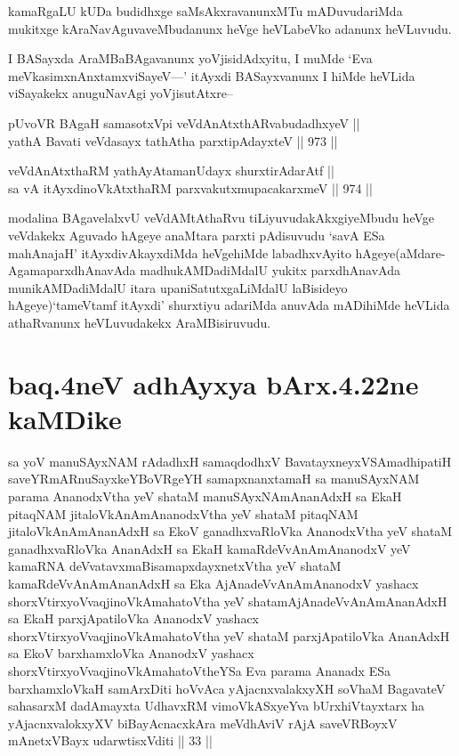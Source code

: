 \begin{artha}
kamaRgaLU kUDa budidhxge saMsAkxravanunxMTu mADuvudariMda mukitxge kAraNavAguvaveMbudanunx heVge heVLabeVko adanunx heVLuvudu.
\end{artha}

\begin{artha}
I BASayxda AraMBaBAgavanunx yoVjisidAdxyitu, I muMde `Eva meVkasimxnAnxtamxviSayeV---' itAyxdi BASayxvanunx I hiMde heVLida viSayakekx anuguNavAgi yoVjisutAtxre--
\end{artha}

\begin{shl}
pUvoVR BAgaH samasotxV\s pi veVdAnAtxthARvabudadhxyeV || \\
yathA Bavati veVdasayx tathA\s tha parxtipAdayxteV \hfill || 973 ||  
\end{shl}
				
\begin{shl}
veVdAnAtxthaRM yathAyAtamanUdayx shurxtirAdarAtf || \\
sa vA itAyxdinoVkAtxthaRM parxvakutxmupacakarxmeV \hfill || 974 ||  
\end{shl}


\begin{artha}
modalina BAgavelalxvU veVdAMtAthaRvu tiLiyuvudakAkxgiyeMbudu heVge veVdakekx Aguvado hAgeye anaMtara parxti pAdisuvudu `savA ESa mahAnajaH' itAyxdivAkayxdiMda heVgehiMde labadhxvAyito hAgeye(aMdare- AgamaparxdhAnavAda madhukAMDadiMdalU yukitx parxdhAnavAda munikAMDadiMdalU itara upaniSatutxgaLiMdalU laBisideyo hAgeye)`tameVtamf itAyxdi' shurxtiyu adariMda anuvAda mADihiMde heVLida athaRvanunx heVLuvudakekx AraMBisiruvudu.
\end{artha}

\section*{baq.4neV adhAyxya bArx.4.22ne kaMDike}

\begin{shl}
sa yoV manuSAyxNAM rAdadhxH samaqdodhxV BavatayxneyxVSAmadhipatiH saveYRmARnuSayxkeYBoVRgeYH samapxnanxtamaH sa manuSAyxNAM parama AnanodxV\s tha yeV shataM manuSAyxNAmAnanAdxH sa EkaH pitaqNAM jitaloVkAnAmAnanodxV\s tha yeV shataM pitaqNAM jitaloVkAnAmAnanAdxH sa EkoV ganadhxvaRloVka AnanodxV\s tha yeV shataM ganadhxvaRloVka AnanAdxH sa EkaH kamaRdeVvAnAmAnanodxV yeV kamaRNA deVvatavxmaBisamapxdayxnetxV\s tha yeV shataM kamaRdeVvAnAmAnanAdxH sa Eka AjAnadeVvAnAmAnanodxV yashacx shorxVtirxyoV\s vaqjinoV\s kAmahatoV\s tha yeV shatamAjAnadeVvAnAmAnanAdxH sa EkaH parxjApatiloVka AnanodxV yashacx shorxVtirxyoV\s vaqjinoV\s kAmahatoV\s tha yeV shataM parxjApatiloVka AnanAdxH sa EkoV barxhamxloVka AnanodxV yashacx shorxVtirxyoV\s vaqjinoV\s kAmahatoV\s theYSa Eva parama Ananadx ESa barxhamxloVkaH samArxDiti hoVvAca yAjacnxvalakxyXH soVhaM BagavateV sahasarxM dadAmayxta UdhavxRM vimoVkASxyeYva bUrxhiVtayxtarx ha yAjacnxvalokxyXV biBayAcnacxkAra meVdhAviV rAjA saveVRBoyxV mAnetxVBayx udarwtisxVditi || 33 ||
\end{shl}

